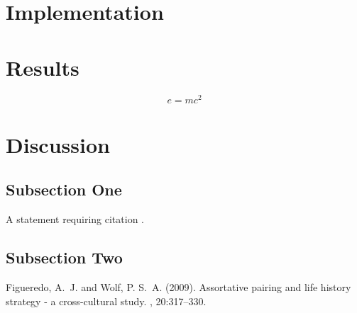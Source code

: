 \documentclass{article}
\begin{document}
	\section{Implementation}
	
	\section{Results}
	
%	
%	
	\begin{equation}
		\label{eq:emc}
		e = mc^2
	\end{equation}
	
	\blindtext %
	
	
	\section{Discussion}
	
	\subsection{Subsection One}
	
	A statement requiring citation \cite{Figueredo:2009dg}.
	\blindtext %
	
	\subsection{Subsection Two}
	
	\blindtext %
	
	
	\begin{thebibliography}{99} %
		
		Figueredo, A.~J. and Wolf, P. S.~A. (2009).
		\newblock Assortative pairing and life history strategy - a cross-cultural
		study.
		, 20:317--330.
		
	\end{thebibliography}
	
	
\end{document}
